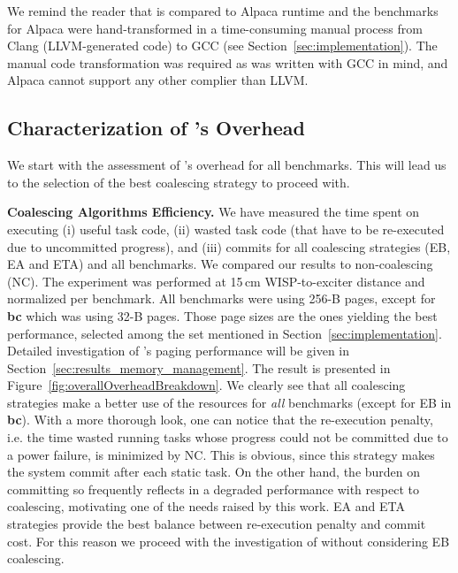 We remind the reader that \sys is compared to Alpaca runtime and the benchmarks for Alpaca were hand-transformed in a time-consuming manual process from Clang (LLVM-generated code) to GCC (see Section~\ref{sec:implementation}). The manual code transformation was required as \sys was written with GCC in mind, and Alpaca cannot support any other complier than LLVM.


\subsection{Characterization of \sys's Overhead}
\label{sec:coala_overhead}

We start with the assessment of \sys's overhead for all benchmarks. This will lead us to the selection of the best coalescing strategy to proceed with.

\indent \textbf{Coalescing Algorithms Efficiency.} We have measured the time spent on executing (i) useful task code, (ii) wasted task code (that have to be re-executed due to uncommitted progress), and (iii) commits for all coalescing strategies (EB, EA and ETA) and all benchmarks. We compared our results to non-coalescing \sys (NC). The experiment was performed at 15\,cm WISP-to-exciter distance and normalized per benchmark. All benchmarks were using 256-B pages, except for \textbf{bc} which was using 32-B pages. Those page sizes are the ones yielding the best performance, selected among the set mentioned in Section~\ref{sec:implementation}. Detailed investigation of \sys's paging performance will be given in Section~\ref{sec:results_memory_management}.
%
The result is presented in Figure~\ref{fig:overallOverheadBreakdown}. We clearly see that all coalescing strategies make a better use of the resources for \emph{all} benchmarks (except for EB in \textbf{bc}).
With a more thorough look, one can notice that the re-execution penalty, i.e. the time wasted running tasks whose progress could not be committed due to a power failure, is minimized by NC. This is obvious, since this strategy makes the system commit after each static task.
On the other hand, the burden on committing so frequently reflects in a degraded performance with respect to coalescing, motivating one of the needs raised by this work.
EA and ETA strategies provide the best balance between re-execution penalty and commit cost. For this reason we proceed with the investigation of \sys without considering EB coalescing.

